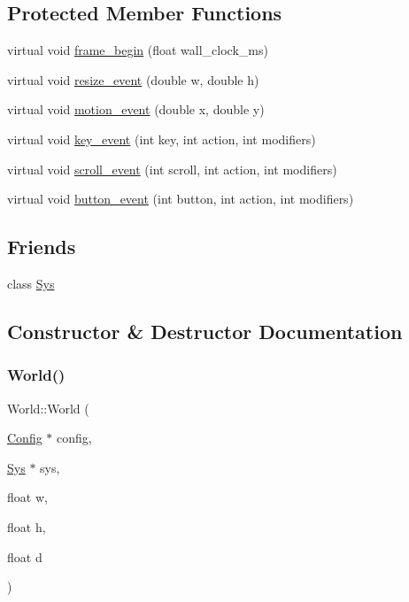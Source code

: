 \subsection*{Protected Member Functions}
\begin{DoxyCompactItemize}
\item 
virtual void \mbox{\hyperlink{classWorld_a31a7f317338492f86ad62111c8869a98}{frame\+\_\+begin}} (float wall\+\_\+clock\+\_\+ms)
\item 
virtual void \mbox{\hyperlink{classWorld_aefc26f5ed9efe0753c3120009f608b89}{resize\+\_\+event}} (double w, double h)
\item 
virtual void \mbox{\hyperlink{classWorld_ae9da24cdb1ba2803d48cf8d46c851c4b}{motion\+\_\+event}} (double x, double y)
\item 
virtual void \mbox{\hyperlink{classWorld_a46ecee55e2359c32f14c0d8d084dad73}{key\+\_\+event}} (int key, int action, int modifiers)
\item 
virtual void \mbox{\hyperlink{classWorld_af3d69f01929d97f989d1887f269f9c56}{scroll\+\_\+event}} (int scroll, int action, int modifiers)
\item 
virtual void \mbox{\hyperlink{classWorld_adea3d936b96e1bef8eb07b6462cab236}{button\+\_\+event}} (int button, int action, int modifiers)
\end{DoxyCompactItemize}
\subsection*{Friends}
\begin{DoxyCompactItemize}
\item 
class \mbox{\hyperlink{classWorld_a3cda1ee24b48e8d3c85b7e253f49cfb7}{Sys}}
\end{DoxyCompactItemize}


\subsection{Constructor \& Destructor Documentation}
\mbox{\label{classWorld_ab50208fdc8cf13d49174777ed262f507}} 
\subsubsection{\texorpdfstring{World()}{World()}}
{\footnotesize\ttfamily World\+::\+World (\begin{DoxyParamCaption}\item[{\mbox{\hyperlink{classConfig}{Config}} $\ast$}]{config,  }\item[{\mbox{\hyperlink{classSys}{Sys}} $\ast$}]{sys,  }\item[{float}]{w,  }\item[{float}]{h,  }\item[{float}]{d }\end{DoxyParamCaption})}

